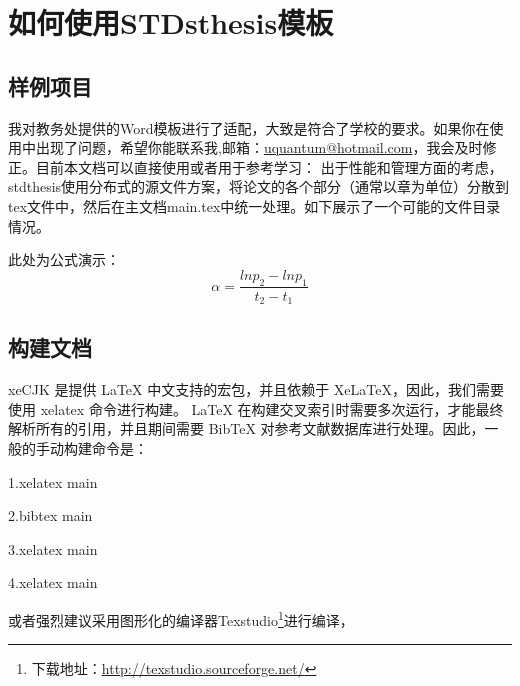 
\chapter{如何使用STDsthesis模板}
\section{样例项目}
我对教务处提供的Word模板进行了适配，大致是符合了学校的要求。如果你在使用中出现了问题，希望你能联系我,邮箱：\href{uquantum@hotmail.com}{uquantum@hotmail.com}，我会及时修正。目前本文档可以直接使用或者用于参考学习：
出于性能和管理方面的考虑，stdthesis使用分布式的源文件方案，将论文的各个部分（通常以章为单位）分散到tex文件中，然后在主文档main.tex中统一处理。如下展示了一个可能的文件目录情况。

此处为公式演示：
\begin{equation}
\alpha=\dfrac{lnp_2-lnp_1}{t_2-t_1}\label{eq:zuning}
\end{equation}
\section{构建文档}
xeCJK 是提供 LaTeX 中文支持的宏包，并且依赖于 XeLaTeX，因此，我们需要使用 xelatex 命令进行构建。
LaTeX 在构建交叉索引时需要多次运行，才能最终解析所有的引用，并且期间需要 BibTeX 对参考文献数据库进行处理。因此，一般的手动构建命令是：

1.xelatex main

2.bibtex main

3.xelatex main

4.xelatex main

或者强烈建议采用图形化的编译器Texstudio\footnote{下载地址：\href{http://texstudio.sourceforge.net/}{http://texstudio.sourceforge.net/}}进行编译，
